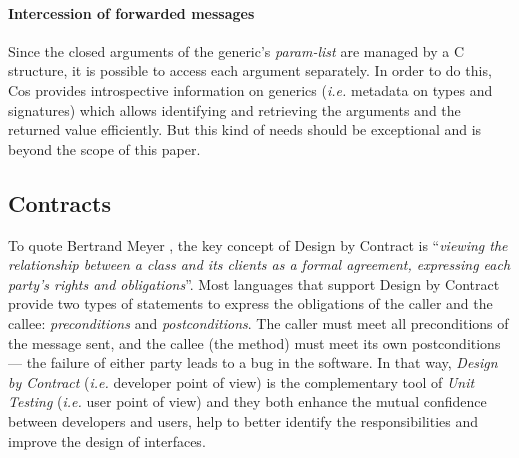 \documentclass[preprint,10pt]{sigplanconf}
\newcommand{\abbrev}[1]{{\em #1}\xspace}
\newcommand{\ie}{\abbrev{i.e.}}
\newcommand{\ProgLang}[1]{{\sc #1}\xspace}
\newcommand{\Cos}       {\ProgLang{Cos}}
\begin{document}
\paragraph{Intercession of forwarded messages}

Since the closed arguments of the generic's {\em param-list} are managed by a C structure, it is possible to access each argument separately. In order to do this, \Cos provides introspective information on generics (\ie metadata on types and signatures) which allows identifying and retrieving the arguments and the returned value efficiently. But this kind of needs should be exceptional and is beyond the scope of this paper.









\subsection{Contracts\label{ssec:ctr}}

To quote Bertrand Meyer \cite{mey97}, the key concept of Design by Contract is ``{\em viewing the relationship between a class and its clients as a formal agreement, expressing each party's rights and obligations}''. Most languages that support Design by Contract provide
two types of statements to express the obligations of the caller and the callee: {\em preconditions} and {\em postconditions}. The caller must meet all preconditions of the message sent, and the callee (the method) must meet its own postconditions --- the failure of either party leads to a bug in the software. In that way, {\em Design by Contract} (\ie developer point of view) is the complementary tool of {\em Unit Testing} \cite{ken02} (\ie user point of view) and they both enhance the mutual confidence between developers and users, help to better identify the responsibilities and improve the design of interfaces.
\end{document}
